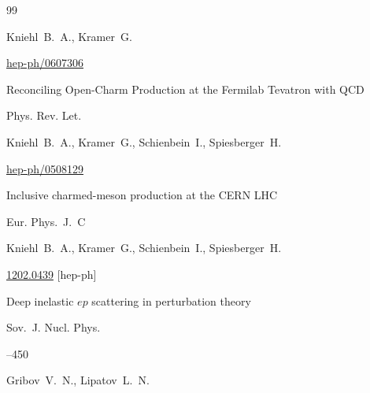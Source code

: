 \begin{thebibliography}{99}


\by Kniehl~B.~A., Kramer~G.



\arxiv \href{http://arxiv.org/abs/hep-ph/0607306}{hep-ph/0607306}






\paper Reconciling Open-Charm Production at the Fermilab Tevatron with QCD


\jour Phys. Rev. Let. 



\by  Kniehl~B.~A., Kramer~G., Schienbein~I., Spiesberger~H.



\arxiv \href{http://arxiv.org/abs/hep-ph/0508129}{hep-ph/0508129}






\paper Inclusive charmed-meson production at the CERN LHC


\paper \jour Eur. Phys.~J.~C 



\by  Kniehl~B.~A.,  Kramer~G.,  Schienbein~I.,  Spiesberger~H.



\arxiv \href{http://arxiv.org/abs/1202.0439}{1202.0439}  [hep-ph]




\paper Deep inelastic $ep$ scattering in perturbation theory 

\jour Sov.~J. Nucl. Phys.




--450

\by Gribov~V.~N., Lipatov~L.~N.




\end{thebibliography}
